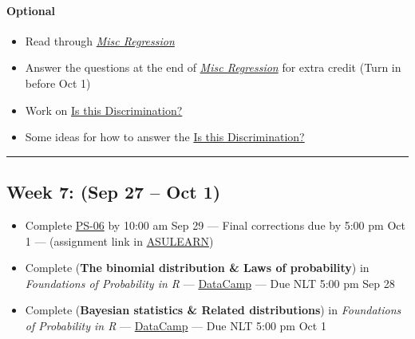 \documentclass[
]{article}
\begin{document}
\begin{rmdoptional}
\hypertarget{optional}{%
\paragraph*{Optional}\label{optional}}

\begin{itemize}
\item
  Read through \href{../Rmarkdown/MiscRegression.html}{\emph{Misc
  Regression}}
\item
  Answer the questions at the end of
  \href{../Rmarkdown/MiscRegression.html}{\emph{Misc Regression}} for
  extra credit (Turn in before Oct 1)
\item
  Work on \href{../Rmarkdown/ClassAssignment.html}{Is this
  Discrimination?}
\item
  Some ideas for how to answer the
  \href{../Rmarkdown/discrimination.html}{Is this Discrimination?}
\end{itemize}
\end{rmdoptional}

\begin{center}\rule{0.5\linewidth}{0.5pt}\end{center}

\hypertarget{week-7-sep-27-oct-1}{%
\subsection*{Week 7: (Sep 27 -- Oct 1)}\label{week-7-sep-27-oct-1}}

\begin{itemize}
\item
  Complete
  \href{https://classroom.github.com/classrooms/87543903-stt3850-fall2021}{PS-06}
  by 10:00 am Sep 29 --- Final corrections due by 5:00 pm Oct 1 ---
  (assignment link in
  \href{https://asulearn.appstate.edu/course/view.php?id=131169}{ASULEARN})
\item
  Complete (\textbf{The binomial distribution \& Laws of probability})
  in \emph{Foundations of Probability in R} ---
  \href{https://app.datacamp.com/groups/stt3850-fall2021/assignments}{DataCamp}
  --- Due NLT 5:00 pm Sep 28
\item
  Complete (\textbf{Bayesian statistics \& Related distributions}) in
  \emph{Foundations of Probability in R} ---
  \href{https://app.datacamp.com/groups/stt3850-fall2021/assignments}{DataCamp}
  --- Due NLT 5:00 pm Oct 1
\end{itemize}
\end{document}
